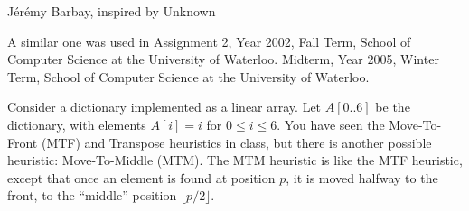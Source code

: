 \begin{authorship}J\'er\'emy Barbay, inspired by Unknown\end{authorship}
\begin{usage}
A similar one was used in Assignment 2, Year 2002, Fall Term, School of Computer Science at the University of Waterloo.
Midterm, Year 2005, Winter Term, School of Computer Science at the University of Waterloo.
\end{usage}
 Consider a dictionary implemented as a linear array.
%
Let $A[0..6]$ be the dictionary, with elements $A[i]=i$ for $0 \leq i
\leq 6$.
%
You have seen the Move-To-Front (MTF) and Transpose heuristics in
class, but there is another possible heuristic: Move-To-Middle (MTM).
%
The MTM heuristic is like the MTF heuristic, except that once
an element is found at position $p$, it is moved halfway to the front,
to the ``middle'' position $\lfloor p/2\rfloor$.


